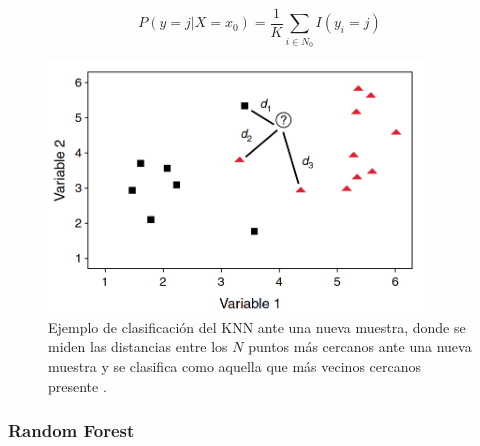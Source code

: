\documentclass{uathesis-es}
\begin{document}
\[
    P(y = j | X = x_0)  = \frac{1}{K} \sum_{i\in N_0} I(y_i = j)
\]

\begin{figure}[H]
    \centering
    \includegraphics[width=10cm]{Figures/Background/KNN.png}
    \caption{Ejemplo de clasificación del KNN ante una nueva muestra, donde se miden las distancias entre los $N$ puntos más cercanos ante una nueva muestra y se clasifica como aquella que más vecinos cercanos presente \cite{VIDUEIRAFERREIRA2015195}.}
    \label{KNN_BACKGROUND}
\end{figure}


\subsubsection*{Random Forest}
\label{RF_INTRODUCTION_TO_ENSEMBLES}

\end{document}
